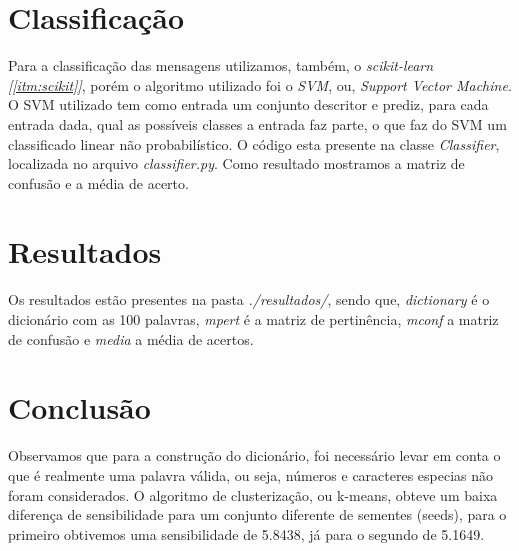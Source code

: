 \documentclass[a4paper,10pt]{article}
\begin{document}
\section{Classificação}\label{itm:classificar}
Para a classificação das mensagens utilizamos, também, o \emph{scikit-learn [\ref{itm:scikit}]},
porém o algoritmo utilizado foi o \emph{SVM}, ou, \emph{Support Vector Machine}.  O SVM utilizado tem como entrada um conjunto descritor e prediz, para cada entrada dada, qual as possíveis classes a entrada faz parte, o que faz do SVM um classificado linear não probabilístico. O código esta presente na classe \emph{Classifier}, localizada no arquivo \emph{classifier.py}. Como resultado mostramos a matriz de confusão e a média de acerto.

\section{Resultados}
Os resultados estão presentes na pasta \emph{./resultados/}, sendo que, \emph{dictionary} é o dicionário com as 100 palavras, \emph{mpert} é a matriz de pertinência, \emph{mconf} a matriz de confusão e \emph{media} a média de acertos.
\section{Conclusão}
Observamos que para a construção do dicionário, foi necessário levar em conta o que é realmente uma palavra válida, ou seja, números e caracteres especias não foram considerados. O algoritmo de clusterização, ou k-means, obteve um baixa diferença de sensibilidade para um conjunto diferente de sementes (seeds), para o primeiro obtivemos uma sensibilidade de 5.8438, já para o segundo de 5.1649.
\end{document}
